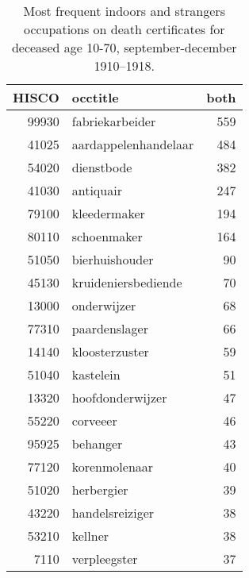\begin{table}

\caption{\label{tab:tab:topboth}Most frequent indoors and strangers occupations on death certificates for deceased age 10-70, september-december 1910–1918.}
\centering
\begin{tabular}[t]{r|l|r}
\hline
HISCO & occtitle & both\\
\hline
99930 & fabriekarbeider & 559\\
\hline
41025 & aardappelenhandelaar & 484\\
\hline
54020 & dienstbode & 382\\
\hline
41030 & antiquair & 247\\
\hline
79100 & kleedermaker & 194\\
\hline
80110 & schoenmaker & 164\\
\hline
51050 & bierhuishouder & 90\\
\hline
45130 & kruideniersbediende & 70\\
\hline
13000 & onderwijzer & 68\\
\hline
77310 & paardenslager & 66\\
\hline
14140 & kloosterzuster & 59\\
\hline
51040 & kastelein & 51\\
\hline
13320 & hoofdonderwijzer & 47\\
\hline
55220 & corveeer & 46\\
\hline
95925 & behanger & 43\\
\hline
77120 & korenmolenaar & 40\\
\hline
51020 & herbergier & 39\\
\hline
43220 & handelsreiziger & 38\\
\hline
53210 & kellner & 38\\
\hline
7110 & verpleegster & 37\\
\hline
\end{tabular}
\end{table}

